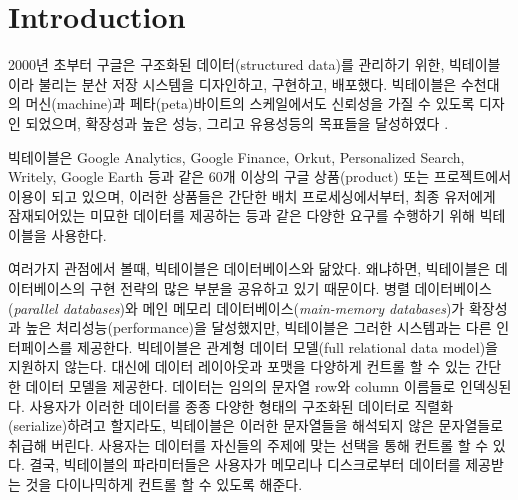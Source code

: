 \documentclass[twocolumn]{article}
\begin{document}
\section{Introduction}

2000년 초부터 구글은 구조화된 데이터(structured data)를 관리하기 위한, 빅테이블이라 불리는 분산 저장 시스템을 디자인하고, 구현하고, 배포했다.
빅테이블은 수천대의 머신(machine)과 페타(peta)바이트의 스케일에서도 신뢰성을 가질 수 있도록 디자인 되었으며, 확장성과 높은 성능, 그리고 유용성등의 목표들을 달성하였다 \cite{Chang:2008:BDS}.

빅테이블은 Google Analytics, Google Finance, Orkut, Personalized Search, Writely, Google Earth 등과 같은 60개 이상의 구글 상품(product) 또는 프로젝트에서 이용이 되고 있으며, 이러한 상품들은 간단한 배치 프로세싱에서부터, 최종 유저에게 잠재되어있는 미묘한 데이터를 제공하는 등과 같은 다양한 요구를 수행하기 위해 빅테이블을 사용한다.
 
 여러가지 관점에서 볼때,  빅테이블은 데이터베이스와 닮았다. 왜냐하면, 빅테이블은 데이터베이스의 구현 전략의 많은 부분을 공유하고 있기 때문이다.
 병렬 데이터베이스(\textit{parallel databases})와 메인 메모리 데이터베이스(\textit{main-memory databases})가 확장성과 높은 처리성능(performance)을 달성했지만, 빅테이블은 그러한 시스템과는 다른 인터페이스를 제공한다. 빅테이블은 관계형 데이터 모델(full relational data model)을 지원하지 않는다. 대신에 데이터 레이아웃과 포맷을 다양하게 컨트롤 할 수 있는 간단한 데이터 모델을 제공한다.
데이터는 임의의 문자열 row와 column 이름들로 인덱싱된다. 사용자가 이러한 데이터를 종종 다양한 형태의 구조화된 데이터로 직렬화(serialize)하려고 할지라도, 빅테이블은 이러한 문자열들을 해석되지 않은 문자열들로 취급해 버린다. 사용자는 데이터를 자신들의 주제에 맞는 선택을 통해 컨트롤 할 수 있다. 결국, 빅테이블의 파라미터들은 사용자가 메모리나 디스크로부터 데이터를 제공받는 것을 다이나믹하게 컨트롤 할 수 있도록 해준다.
 
\end{document}
